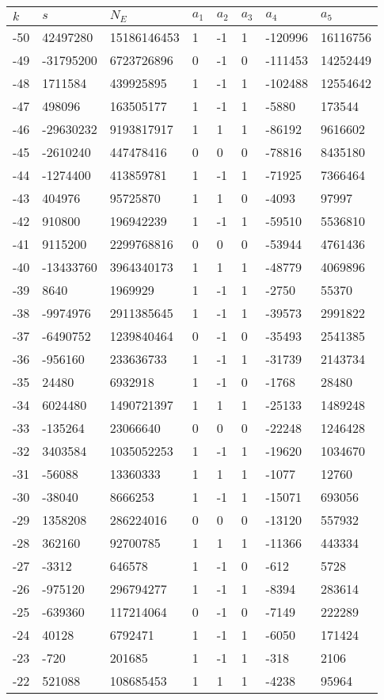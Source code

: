 \documentclass{amsart}
\begin{document}
\begin{longtable}{|l|l|l|lllll|}
\hline
$k$ & $s$ & $N_E$ & $a_1$ & $a_2$ & $a_3$ & $a_4$ & $a_5$\\
\hline
-50&42497280&15186146453&1&-1&1&-120996&16116756\\
-49&-31795200&6723726896&0&-1&0&-111453&14252449\\
-48&1711584&439925895&1&-1&1&-102488&12554642\\
-47&498096&163505177&1&-1&1&-5880&173544\\
-46&-29630232&9193817917&1&1&1&-86192&9616602\\
-45&-2610240&447478416&0&0&0&-78816&8435180\\
-44&-1274400&413859781&1&-1&1&-71925&7366464\\
-43&404976&95725870&1&1&0&-4093&97997\\
-42&910800&196942239&1&-1&1&-59510&5536810\\
-41&9115200&2299768816&0&0&0&-53944&4761436\\
-40&-13433760&3964340173&1&1&1&-48779&4069896\\
-39&8640&1969929&1&-1&1&-2750&55370\\
-38&-9974976&2911385645&1&-1&1&-39573&2991822\\
-37&-6490752&1239840464&0&-1&0&-35493&2541385\\
-36&-956160&233636733&1&-1&1&-31739&2143734\\
-35&24480&6932918&1&-1&0&-1768&28480\\
-34&6024480&1490721397&1&1&1&-25133&1489248\\
-33&-135264&23066640&0&0&0&-22248&1246428\\
-32&3403584&1035052253&1&-1&1&-19620&1034670\\
-31&-56088&13360333&1&1&1&-1077&12760\\
-30&-38040&8666253&1&-1&1&-15071&693056\\
-29&1358208&286224016&0&0&0&-13120&557932\\
-28&362160&92700785&1&1&1&-11366&443334\\
-27&-3312&646578&1&-1&0&-612&5728\\
-26&-975120&296794277&1&-1&1&-8394&283614\\
-25&-639360&117214064&0&-1&0&-7149&222289\\
-24&40128&6792471&1&-1&1&-6050&171424\\
-23&-720&201685&1&-1&1&-318&2106\\
-22&521088&108685453&1&1&1&-4238&95964\\

\end{longtable}
\end{document}
